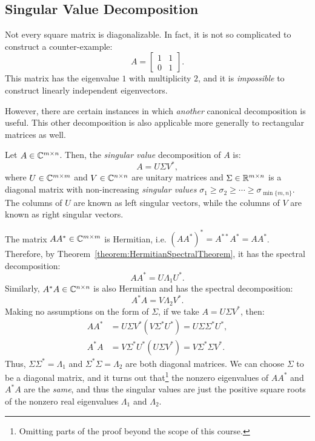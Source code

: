 \subsection{Singular Value Decomposition}

Not every square matrix is diagonalizable. In fact, it is not so complicated to construct a counter-example:
\[
A = \begin{bmatrix} 1 & 1\\ 0 & 1\end{bmatrix}.
\]
This matrix has the eigenvalue $1$ with multiplicity $2$, and it is {\em impossible} to construct linearly independent eigenvectors.

However, there are certain instances in which {\em another} canonical decomposition is useful. This other decomposition is also applicable more generally to rectangular matrices as well.

\begin{theorem}
Let $A\in\mathbb{C}^{m\times n}$. Then, the {\em singular value} decomposition of $A$ is:
\[
A = U\Sigma V^*,
\]
where $U\in\mathbb{C}^{m\times m}$ and $V\in\mathbb{C}^{n\times n}$ are unitary matrices and $\Sigma\in\mathbb{R}^{m\times n}$ is a diagonal matrix with non-increasing {\em singular values} $\sigma_1\ge\sigma_2\ge\cdots\ge\sigma_{\min\{m,n\}}$. The columns of $U$ are known as left singular vectors, while the columns of $V$ are known as right singular vectors.
\end{theorem}
\begin{proofsketch}
The matrix $AA^*\in\mathbb{C}^{m\times m}$ is Hermitian, i.e. $(AA^*)^* = A^{**}A^* = AA^*$. Therefore, by Theorem~\ref{theorem:HermitianSpectralTheorem}, it has the spectral decomposition:
\[
AA^* = U\Lambda_1 U^*.
\]
Similarly, $A^*A\in\mathbb{C}^{n\times n}$ is also Hermitian and has the spectral decomposition:
\[
A^*A = V\Lambda_2 V^*.
\]
Making no assumptions on the form of $\Sigma$, if we take $A=U\Sigma V^*$, then:
\begin{align*}
AA^* & = U\Sigma V^* (V\Sigma^*U^*) = U\Sigma\Sigma^* U^*,\\
A^*A & = V\Sigma^* U^* (U\Sigma V^*) = V\Sigma^*\Sigma V^*.
\end{align*}
Thus, $\Sigma\Sigma^* = \Lambda_1$ and $\Sigma^*\Sigma = \Lambda_2$ are both diagonal matrices. We can choose $\Sigma$ to be a diagonal matrix, and it turns out that\footnote{Omitting parts of the proof beyond the scope of this course.} the nonzero eigenvalues of $AA^*$ and $A^*A$ are the {\em same}, and thus the singular values are just the positive square roots of the nonzero real eigenvalues $\Lambda_1$ and $\Lambda_2$.
\end{proofsketch}

